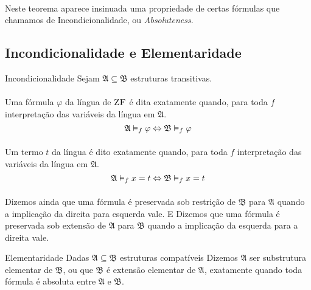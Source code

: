         \paragraph{}
            Neste teorema aparece insinuada uma propriedade de certas fórmulas que 
            chamamos de Incondicionalidade, ou \emph{Absoluteness}.
        \subsection{Incondicionalidade e Elementaridade}
            \begin{definition}{Incondicionalidade}
                    Sejam $\mathfrak{A}\subseteq\mathfrak{B}$ estruturas transitivas.
                \paragraph{}
                    Uma fórmula $\varphi$ da língua de $\text{\sc ZF}$ é dita  exatamente quando, para toda 
                    $f$ interpretação das variáveis da língua em $\mathfrak{A}$.
                    $$ \mathfrak{A}\vDash_f \varphi \Leftrightarrow \mathfrak{B}\vDash_f \varphi $$
                \paragraph{}
                    Um termo $t$ da língua é dito  exatamente quando, para toda 
                    $f$ interpretação das variáveis da língua em $\mathfrak{A}$.
                    $$ \mathfrak{A}\vDash_f x = t \Leftrightarrow \mathfrak{B}\vDash_f x = t $$
                \paragraph{}
                    Dizemos ainda que uma fórmula é preservada sob restrição de $\mathfrak{B}$
                    para $\mathfrak{A}$ quando a implicação da direita para esquerda vale. E 
                    Dizemos que uma fórmula é preservada sob extensão de $\mathfrak{A}$ para 
                    $\mathfrak{B}$ quando a implicação da esquerda para a direita vale.
            \end{definition}
            \begin{definition}{Elementaridade}
                Dadas $\mathfrak{A}\subseteq\mathfrak{B}$ estruturas compatíveis
                Dizemos $\mathfrak{A}$ ser substrutura elementar de $\mathfrak{B}$,
                ou que $\mathfrak{B}$ é extensão elementar de $\mathfrak{A}$, 
                exatamente quando toda fórmula é absoluta entre $\mathfrak{A}$ e $\mathfrak{B}$.
            \end{definition}
